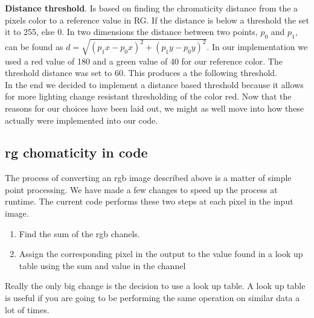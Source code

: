 \textbf{Distance threshold}. Is based on finding the chromaticity distance from the a pixels color to a reference value in RG. If the distance is below a threshold the set it to 255, else 0. In two dimensions the distance between two points, $p_0$ and $p_1$, can be found as $d = \sqrt{(p_1x - p_0x)^2 +(p_1y - p_0y)^2}$. In our implementation we used a red value of 180 and a green value of 40 for our reference color. The threshold distance was set to 60. This produces a the following threshold.\\
In the end we decided to implement a distance based threshold because it allows for more lighting change resistant thresholding of the color red. Now that the reasons for our choices have been laid out, we might as well move into how these actually were implemented into our code.
\subsection{rg chomaticity in code}
The process of converting an rgb image described above is a matter of simple point processing. We have made a few changes to speed up the process at runtime. The current code performs these two steps at each pixel in the input image.\\
\begin{enumerate}
	\item Find the sum of the rgb chanels.
	\item Assign the corresponding pixel in the output to the value found in a look up table using the sum and value in the channel\\
\end{enumerate}
Really the only big change is the decision to use a look up table. A look up table is useful if you are going to be performing the same operation on similar data a lot of times. 
